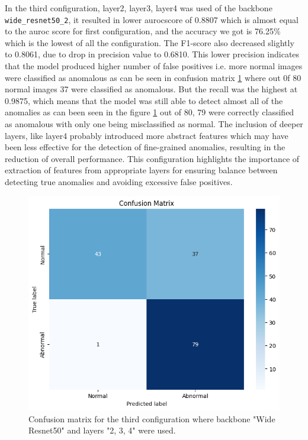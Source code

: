 In the third configuration, layer2, layer3, layer4 was used of the backbone \texttt{wide\_resnet50\_2}, it resulted in lower \gls{auroc}score of 0.8807 which is almost equal to the \gls{auroc} score for first configuration, and the accuracy we got is 76.25\% which is the lowest of all the configuration. The F1-score also decreased slightly to 0.8061, due to drop in precision value to 0.6810. This lower precision indicates that the model produced higher number of false positives i.e. more normal images were classified as anomalous as can be seen in confusion matrix \ref{fig:patchcore config3 confusion matrix} where out 0f 80 normal images 37 were classified as anomalous. But the recall was the highest at 0.9875, which means that the model was still able to detect almost all of the anomalies as can been seen in the figure \ref{fig:patchcore config3 confusion matrix} out of 80, 79 were correctly classified as anomalous with only one being misclassified as normal. The inclusion of deeper layers, like layer4 probably introduced more abstract features which may have been less effective for the detection of fine-grained anomalies, resulting in the reduction of overall performance. This configuration highlights the importance of extraction of features from appropriate layers for ensuring balance between detecting true anomalies and avoiding excessive false positives.

\begin{figure}[ht!]
    \centering
    \includegraphics[width=1\linewidth]{Rohit_Master_Thesis//Images/patchcore_config3_confusion_matrix.jpg}
    \caption{Confusion matrix for the third configuration where backbone "Wide Resnet50" and layers "2, 3, 4" were used.}
    \label{fig:patchcore config3 confusion matrix}
\end{figure}

